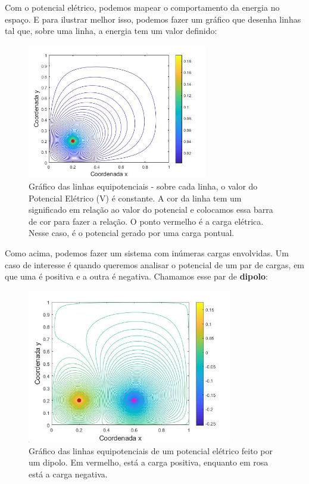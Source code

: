 \documentclass[12pt]{extarticle}
\newcommand{\<}{\langle}
\renewcommand{\>}{\rangle}
\theoremstyle{definition}
\begin{document}
Com o potencial elétrico, podemos mapear o comportamento da energia no espaço. E para ilustrar melhor isso, podemos fazer um gráfico que desenha linhas tal que, sobre uma linha, a energia tem um valor definido:
\begin{figure}[H]
    \centering
    \includegraphics[width=0.7\textwidth]{potential_1.jpg}
    \caption{Gráfico das linhas equipotenciais - sobre cada linha, o valor do Potencial Elétrico (V) é constante. A cor da linha tem um significado em relação ao valor do potencial e colocamos essa barra de cor para fazer a relação. O ponto vermelho é a carga elétrica. Nesse caso, é o potencial gerado por uma carga pontual.}
    \label{fig:potential_point}
\end{figure}

Como acima, podemos fazer um sistema com inúmeras cargas envolvidas. Um caso de interesse é quando queremos analisar o potencial de um par de cargas, em que uma é positiva e a outra é negativa. Chamamos esse par de \textbf{dipolo}:
\begin{figure}[H]
    \centering
    \includegraphics[width=0.8\textwidth]{potential_dipole.jpg}
    \caption{Gráfico das linhas equipotenciais de um potencial elétrico feito por um dipolo. Em vermelho, está a carga positiva, enquanto em rosa está a carga negativa.}
    \label{fig:potential_dipole}
\end{figure}
\end{document}
